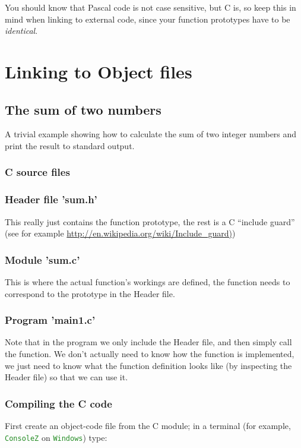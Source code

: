 \documentclass[10pt,a4paper]{article}
\newcommand{\mytext}[1]{\textcolor{ForestGreen}{\texttt{#1}}}
\begin{document}
You should know that Pascal code is not case sensitive, but C is, so keep this in
mind when linking to external code, since your function prototypes have to
be \textit{identical}.
\clearpage

\section{Linking to Object files}
\subsection{The sum of two numbers}
A trivial example showing how to calculate the sum of two integer numbers and print the result to standard output.

\subsubsection{C source files}
\lstset{style=myC}
\subsubsection*{Header file 'sum.h'}
This really just contains the function prototype, the rest is a C  ``include guard'' (see for example \newline
\url{http://en.wikipedia.org/wiki/Include\_guard)})



\subsubsection*{Module 'sum.c'}
This is where the actual function's workings are defined, the function
needs to correspond to the prototype in the Header file.


\newpage
\subsubsection*{Program 'main1.c'}
Note that in the program we only include the Header file, and then simply call the function. We don't actually need to know how the function is implemented, we just need to know what the function definition looks like (by inspecting the Header file) so that we can use it.



\subsubsection*{Compiling the C code}
First create an object-code file from the C module; in a terminal (for example, \mytext{ConsoleZ} on \mytext{Windows}) type:
\end{document}
